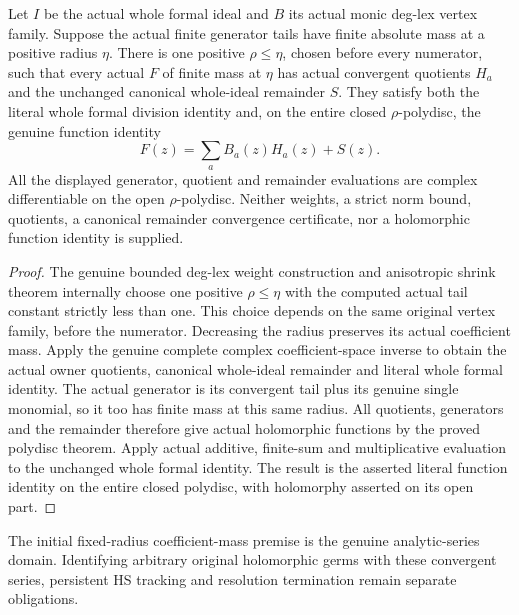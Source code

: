 \begin{theorem}
\label{hir:actual-common-radius-holomorphic-vertex-division}
Let $I$ be the actual whole formal ideal and $B$ its actual monic
deg-lex vertex family. Suppose the actual finite generator tails have
finite absolute mass at a positive radius $\eta$. There is one positive
$\rho\leq\eta$, chosen before every numerator, such that every actual
$F$ of finite mass at $\eta$ has actual convergent quotients $H_a$
and the unchanged canonical whole-ideal remainder $S$. They satisfy
both the literal whole formal division identity and, on the entire
closed $\rho$-polydisc, the genuine function identity
\[
 F(z)=\sum_a B_a(z)H_a(z)+S(z).
\]
All the displayed generator, quotient and remainder evaluations are
complex differentiable on the open $\rho$-polydisc. Neither weights,
a strict norm bound, quotients, a canonical remainder convergence
certificate, nor a holomorphic function identity is supplied.
\leanok
\end{theorem}
\begin{proof}
The genuine bounded deg-lex weight construction and anisotropic
shrink theorem internally choose one positive $\rho\leq\eta$ with
the computed actual tail constant strictly less than one. This
choice depends on the same original vertex family, before the
numerator. Decreasing the radius preserves its actual coefficient
mass. Apply the genuine complete complex coefficient-space inverse
to obtain the actual owner quotients, canonical whole-ideal
remainder and literal whole formal identity. The actual generator
is its convergent tail plus its genuine single monomial, so it too
has finite mass at this same radius. All quotients, generators and
the remainder therefore give actual holomorphic functions by the
proved polydisc theorem. Apply actual additive, finite-sum and
multiplicative evaluation to the unchanged whole formal identity.
The result is the asserted literal function identity on the entire
closed polydisc, with holomorphy asserted on its open part.
\end{proof}

The initial fixed-radius coefficient-mass premise is the genuine
analytic-series domain. Identifying arbitrary original holomorphic
germs with these convergent series, persistent HS tracking and
resolution termination remain separate obligations.
